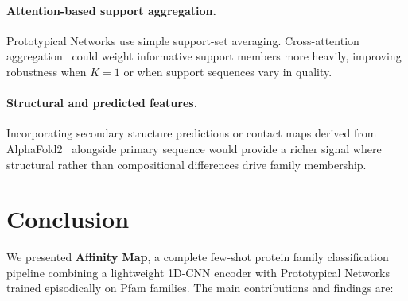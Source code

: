 \documentclass[11pt,a4paper]{article}
\begin{document}
\paragraph{Attention-based support aggregation.}
Prototypical Networks use simple support-set averaging.  Cross-attention
aggregation~\cite{hou2019cross} could weight informative support members more
heavily, improving robustness when $K=1$ or when support sequences vary in quality.

\paragraph{Structural and predicted features.}
Incorporating secondary structure predictions or contact maps derived from
AlphaFold2~\cite{jumper2021alphafold} alongside primary sequence would provide a
richer signal where structural rather than compositional differences drive
family membership.

\section{Conclusion}
\label{sec:conclusion}

We presented \textbf{Affinity Map}, a complete few-shot protein family
classification pipeline combining a lightweight 1D-CNN encoder with Prototypical
Networks trained episodically on Pfam families.  The main contributions and
findings are:
\end{document}
